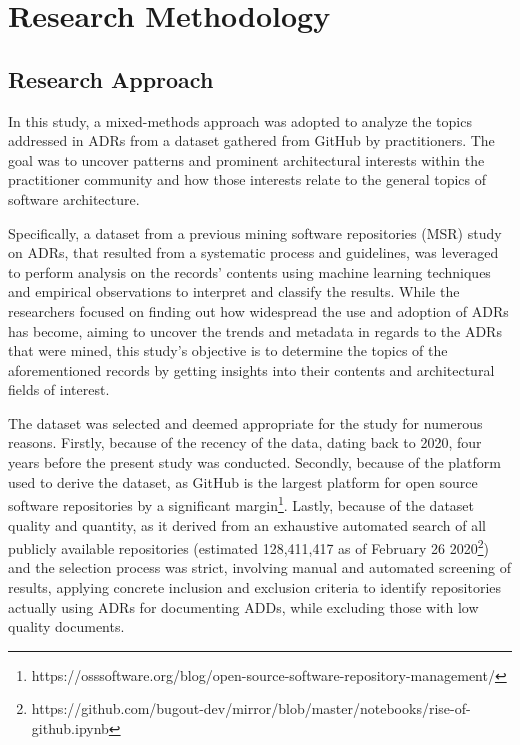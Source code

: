 \chapter{Research Methodology}
    \section{Research Approach}
        In this study, a mixed-methods approach was adopted to analyze the topics addressed in ADRs from a dataset gathered from GitHub by practitioners. The goal was to uncover patterns and prominent architectural interests within the practitioner community and how those interests relate to the general topics of software architecture. 

        Specifically, a dataset from a previous mining software repositories (MSR) study on ADRs, that resulted from a systematic process and guidelines, \cite{Github_study_ADRs, MSR_systematic_process} was leveraged to perform analysis on the records' contents using machine learning techniques and empirical observations to interpret and classify the results. While the researchers focused on finding out how widespread the use and adoption of ADRs has become, aiming to uncover the trends and metadata in regards to the ADRs that were mined, this study's objective is to determine the topics of the aforementioned records by getting insights into their contents and architectural fields of interest.

        The dataset was selected and deemed appropriate for the study for numerous reasons. Firstly, because of the recency of the data, dating back to 2020, four years before the present study was conducted. Secondly, because of the platform used to derive the dataset, as GitHub is the largest platform for open source software repositories by a significant margin\footnote{https://osssoftware.org/blog/open-source-software-repository-management/}. Lastly, because of the dataset quality and quantity, as it derived from an exhaustive automated search of all publicly available repositories  (estimated 128,411,417 as of February 26 2020\footnote{https://github.com/bugout-dev/mirror/blob/master/notebooks/rise-of-github.ipynb}) and the selection process was strict, involving manual and automated screening of results, applying concrete inclusion and exclusion criteria to identify repositories actually using ADRs for documenting ADDs, while excluding those with low quality documents.

